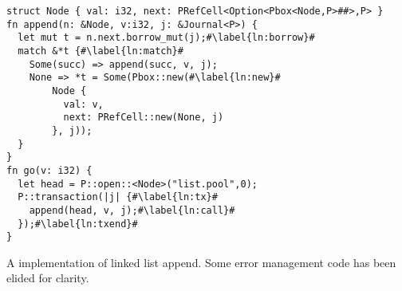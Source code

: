 \begin{lstfloat}
  \begin{lstlisting}[escapechar=\#]
struct Node { val: i32, next: PRefCell<Option<Pbox<Node,P>##>,P> }
fn append(n: &Node, v:i32, j: &Journal<P>) {
  let mut t = n.next.borrow_mut(j);#\label{ln:borrow}#
  match &*t {#\label{ln:match}#
    Some(succ) => append(succ, v, j);
    None => *t = Some(Pbox::new(#\label{ln:new}#
        Node {
          val: v,
          next: PRefCell::new(None, j)
        }, j));
  }
}
fn go(v: i32) {
  let head = P::open::<Node>("list.pool",0);
  P::transaction(|j| {#\label{ln:tx}#
    append(head, v, j);#\label{ln:call}#
  });#\label{ln:txend}#
}
\end{lstlisting}
\caption{A \this{} implementation of linked list append.  Some error management code has been elided for clarity.}
\label{lst:example}
\end{lstfloat}
